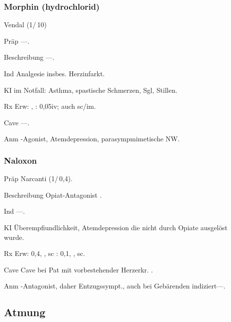 \subsubsection{Morphin (hydrochlorid)}

Vendal (1\Ml*/\,10\Mg*)

\begin{labeling}[:]{mm}
  \item[Präp] ---.
  \item[Beschreibung] ---.
  \item[Ind] Analgesie insbes. Herzinfarkt.
  \item[KI]  im Notfall: Asthma, spastische Schmerzen, Sgl, Stillen.
  \item[Rx] Erw: \Mg* {}, : 0,05\MgKg* iv; auch
  sc/im.
  \item[Cave] ---.
  \item[Anm] {\textmu}-Agonist, Atemdepression, parasympmimetische NW.
\end{labeling}






\subsubsection{Naloxon}


\begin{labeling}[:]{mm}
  \item[Präp]  Narcanti (1\Ml*/\,0,4\Mg*).
  \item[Beschreibung] Opiat-Antagonist .
  \item[Ind] ---.
  \item[KI] Überempfiundlichkeit, Atemdepression die nicht durch Opiate
ausgelöst wurde.
  \item[Rx] Erw: 0,4\Mg* {}, , sc\newline
{}: 0,1\MgKg* {}, , sc.
  \item[Cave]  Cave bei Pat mit vorbestehender Herzerkr. .
  \item[Anm]  {\textmu}-Antagonist, daher Entzugssympt., auch bei Gebärenden
indiziert---.
\end{labeling}


\subsection{Atmung}

